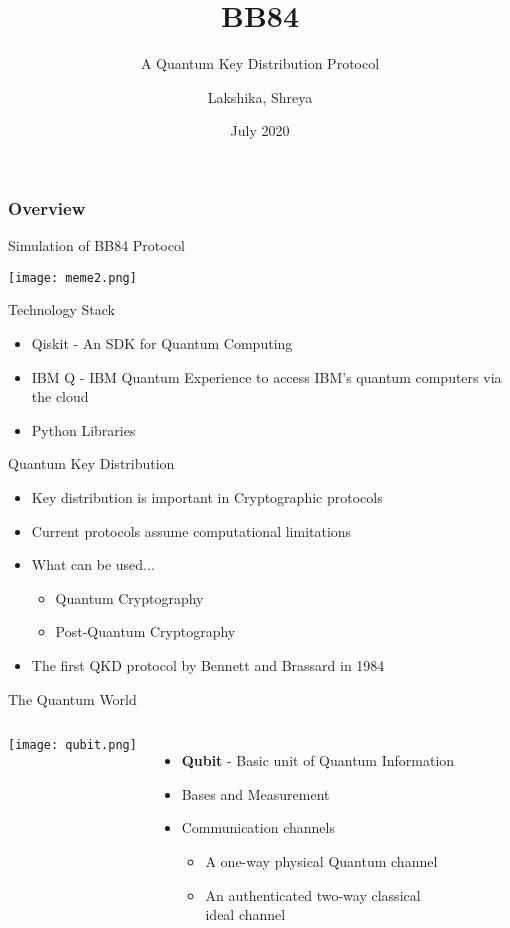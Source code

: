 \documentclass{beamer}
\title[BB84]{BB84}
\subtitle{A Quantum Key Distribution Protocol}
\author[Team 37]{Lakshika, Shreya}
\date{July 2020}
\begin{document}
\begin{frame}
	\titlepage
\end{frame}

\begin{frame}
	\frametitle{Overview}
	 Simulation of BB84 Protocol
\end{frame}


\begin{frame}[Standout]
    \texttt{[image: meme2.png]}
\end{frame}


\begin{frame}{Technology Stack}
	\begin{itemize}
		\item Qiskit - An SDK for Quantum Computing
		\item IBM Q - IBM Quantum Experience to access IBM's quantum computers via the cloud
        \item Python Libraries
	\end{itemize}
\end{frame}


\begin{frame}{Quantum Key Distribution}
    \begin{itemize}[<+->]
        \item Key distribution is important in Cryptographic protocols
        \item Current protocols assume computational limitations
        \item What can be used... 
            \begin{itemize}
                \item Quantum Cryptography
                \item Post-Quantum Cryptography
              \end{itemize}
        \item The first QKD protocol by Bennett and Brassard in 1984
     \end{itemize}
\end{frame}


\begin{frame}{The Quantum World}
     \begin{columns}
                \centering
                \texttt{[image: qubit.png]}
            \begin{itemize}[<+->]
                \item \textbf{Qubit} - Basic unit of Quantum Information
                \item Bases and Measurement
                \item Communication channels
                      \begin{itemize}
                            \item A one-way physical Quantum channel
                            \item An authenticated two-way classical \\ ideal channel
                      \end{itemize}
                \end{itemize}
    \end{columns}
\end{frame}
\end{document}
